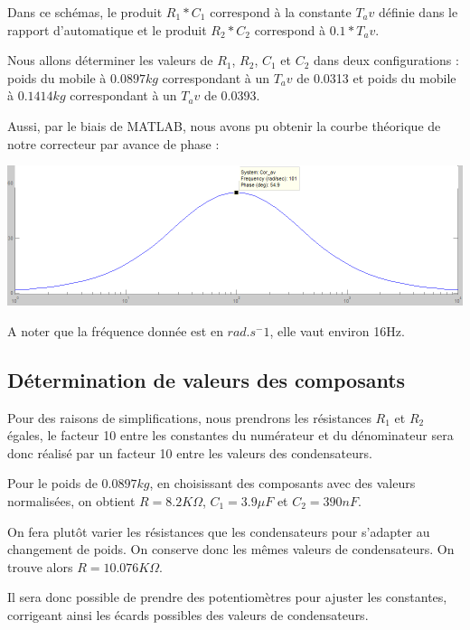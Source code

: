 \documentclass[11pt, french]{article} %
\begin{document}
Dans ce schémas, le produit $R_1*C_1$ correspond à la constante $ T_av$ définie dans le rapport d'automatique et le produit $R_2*C_2$ correspond à $0.1*T_av$.


Nous allons déterminer les valeurs de $R_1$, $R_2$, $C_1$ et $C_2$ dans deux configurations : poids du mobile à $0.0897 kg$ correspondant à un $T_av$ de 0.0313 et poids du mobile à $0.1414 kg$ correspondant à un $T_av$ de 0.0393.


Aussi, par le biais de MATLAB, nous avons pu obtenir la courbe théorique de notre correcteur par avance de phase :

\begin{center}
\includegraphics[width = 15cm]{SolutionAnalogique/aphmat.png} 
\end{center}

A noter que la fréquence donnée est en $rad.s^-1$, elle vaut environ 16Hz. 
\subsection{Détermination de valeurs des composants}

Pour des raisons de simplifications, nous prendrons les résistances $R_1$ et $R_2$ égales, le facteur 10 entre les constantes du numérateur et du dénominateur sera donc réalisé par un facteur 10 entre les valeurs des condensateurs. 



Pour le poids de $0.0897 kg$, en choisissant des composants avec des valeurs normalisées, on obtient $R=8.2 K\Omega$, $C_1=3.9 \mu F$ et $C_2=390 nF$. 



On fera plutôt varier les résistances que les condensateurs pour s'adapter au changement de poids. On conserve donc les mêmes valeurs de condensateurs. On trouve alors $R=10.076 K\Omega$. 



Il sera donc possible de prendre des potentiomètres pour ajuster les constantes, corrigeant ainsi les écards possibles des valeurs de condensateurs. 
\end{document}
